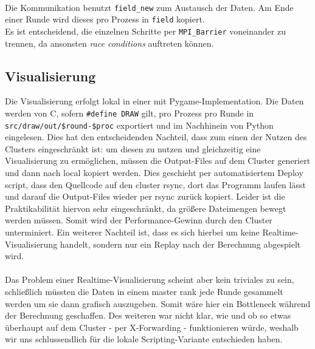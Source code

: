 \quad \\
Die Kommunikation benutzt \texttt{field\_new} zum Austausch der Daten. Am Ende einer Runde wird dieses pro Prozess in \texttt{field} kopiert. \\
Es ist entscheidend, die einzelnen Schritte per \texttt{MPI\_Barrier} voneinander zu trennen, da ansonsten \textit{race conditions} auftreten können.
\newpage

\subsection{Visualisierung}
Die Visualisierung erfolgt lokal in einer mit Pygame-Implementation.
Die Daten werden von C, sofern \texttt{\#define DRAW} gilt, pro Prozess pro Runde in \\ \texttt{src/draw/out/\$round-\$proc} exportiert und im Nachhinein von Python eingelesen.
Dies hat den entscheidenden Nachteil, dass zum einen der Nutzen des Clusters eingeschränkt ist:
um diesen zu nutzen und gleichzeitig eine Visualisierung zu ermöglichen, müssen die Output-Files auf dem Cluster generiert und dann nach local kopiert werden.
Dies geschieht per automatisiertem Deploy script, dass den Quellcode auf den cluster rsync, dort das Programm laufen lässt und darauf die Output-Files wieder per rsync zurück kopiert.
Leider ist die Praktikabilität hiervon sehr eingeschränkt, da größere Dateimengen bewegt werden müssen.
Somit wird der Performance-Gewinn durch den Cluster unterminiert.
Ein weiterer Nachteil ist, dass es sich hierbei um keine Realtime-Visualisierung handelt, sondern nur ein Replay nach der Berechnung abgespielt wird. \\
\quad \\
Das Problem einer Realtime-Visualisierung scheint aber kein triviales zu sein,
schließlich müssten die Daten in einem master rank jede Runde gesammelt werden um sie dann grafisch auszugeben. Somit wäre hier ein Bottleneck während der Berechnung geschaffen.
Des weiteren war nicht klar, wie und ob so etwas überhaupt auf dem Cluster - per X-Forwarding - funktionieren würde, weshalb wir uns schlussendlich für die lokale Scripting-Variante entschieden haben.
\newpage

